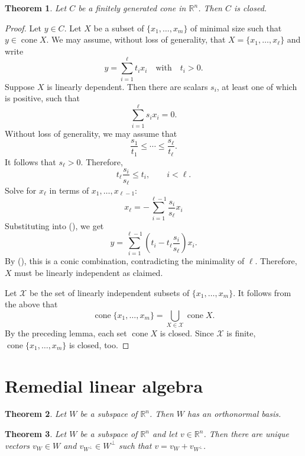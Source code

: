 \documentclass[12pt]{amsart}
\newtheorem{theorem}{Theorem}[section]
\theoremstyle{definition}
\theoremstyle{remark}
\numberwithin{equation}{section}
\newcommand{\RR}{\mathbb{R}}
\DeclareMathOperator{\cone}{cone}
\begin{document}
\begin{theorem}
    Let $C$ be a finitely generated cone in $\RR^n$.
    Then $C$ is closed.
\end{theorem}

\begin{proof}
    Let $y\in C$.
    Let $X$ be a subset of $\{x_1,\ldots,x_m\}$ of minimal size
    such that $y\in \cone X$.
    We may assume, without loss of generality,
    that $X=\{x_1,\ldots,x_\ell\}$ and write
    \[
        y = \sum_{i=1}^\ell t_ix_i\quad\text{with}\quad t_i>0.
        \tag{\dag}
    \]
    Suppose $X$ is linearly dependent.
    Then there are scalars $s_i$, at least one of which is positive, such that
    \[
        \sum_{i=1}^\ell s_ix_i=0.
    \]
    Without loss of generality, we may assume that
    \[
        \frac{s_1}{t_1}\leq \cdots\leq \frac{s_\ell}{t_\ell}.
    \]
    It follows that $s_\ell > 0$.
    Therefore,
    \[
        t_\ell\frac{s_i}{s_\ell}\leq t_i,\qquad i<\ell.
        \tag{\ddag}
    \]
    Solve for $x_\ell$ in terms of $x_1,\ldots,x_{\ell-1}$:
    \[
        x_\ell = -\sum_{i=1}^{\ell-1}\frac{s_i}{s_\ell}x_i
    \]
    Substituting into (\dag), we get
    \[
        y = \sum_{i=1}^{\ell-1} \left(t_i
        - t_\ell\frac{s_i}{s_\ell}\right)x_i.
    \]
    By (\ddag), this is a conic combination,
    contradicting the minimality of $\ell$.
    Therefore, $X$ must be linearly independent as claimed.

    Let $\mathcal{X}$ be the set of linearly independent subsets of
    $\{x_1,\ldots,x_m\}$. It follows from the above that
    \[
        \cone\{x_1,\ldots,x_m\} = \bigcup_{X\in\mathcal{X}}\cone X.
    \]
    By the preceding lemma, each set $\cone X$ is closed.
    Since $\mathcal{X}$ is finite, $\cone\{x_1,\ldots,x_m\}$ is closed, too.
\end{proof}

\section{Remedial linear algebra}

\begin{theorem}
    Let $W$ be a subspace of $\RR^n$. Then $W$ has an orthonormal basis.
\end{theorem}

\begin{theorem}
    Let $W$ be a subspace of $\RR^n$ and let $v\in\RR^n$.
    Then there are unique vectors $v_W\in W$ and $v_{W^\perp}\in W^\perp$
    such that $v=v_W + v_{W^\perp}$.
\end{theorem}
\end{document}
